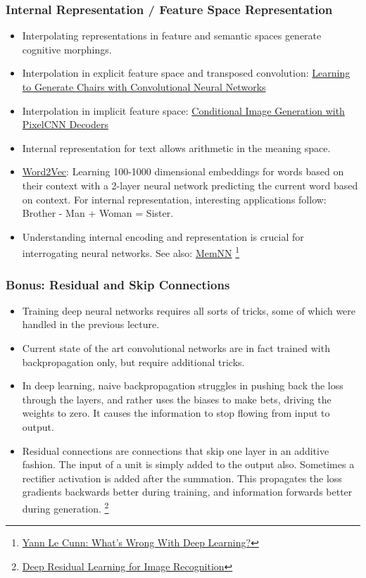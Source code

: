 \documentclass[8pt]{beamer}
\begin{document}
\begin{frame}
\frametitle{Internal Representation / Feature Space Representation}
 \begin{itemize}
  \item Interpolating representations in feature and semantic spaces generate cognitive morphings.
  \item Interpolation in explicit feature space and transposed convolution:
        \href{https://www.youtube.com/watch?v=QCSW4isBDL0}{Learning to Generate Chairs with Convolutional Neural Networks}
  \item Interpolation in implicit feature space:
        \href{https://arxiv.org/abs/1606.05328}{Conditional Image Generation with PixelCNN Decoders}
  \item Internal representation for text allows arithmetic in the meaning space.
  \item \href{http://deeplearning4j.org/word2vec.html}{Word2Vec}: Learning 100-1000 dimensional embeddings for words based on their context with a 2-layer neural network
        predicting the current word based on context. For internal representation, interesting applications follow: Brother - Man + Woman = Sister.
  \item Understanding internal encoding and representation is crucial for interrogating neural networks. See also: \href{http://arxiv.org/pdf/1410.3916v11.pdf}{MemNN}
        \footnote{\href{http://www.pamitc.org/cvpr15/files/lecun-20150610-cvpr-keynote.pdf}{Yann Le Cunn: What's Wrong With Deep Learning?}}
 \end{itemize}
\end{frame}

\begin{frame}
\frametitle{Bonus: Residual and Skip Connections}
 \begin{itemize}
  \item Training deep neural networks requires all sorts of tricks, some of which were handled in the previous lecture.
  \item Current state of the art convolutional networks are in fact trained with backpropagation only, but require additional tricks.
  \item In deep learning, naive backpropagation struggles in pushing back the loss through the layers, and rather uses the biases to make bets, driving the weights to zero.
        It causes the information to stop flowing from input to output.
  \item Residual connections are connections that skip one layer in an additive fashion.
        The input of a unit is simply added to the output also. Sometimes a rectifier activation is added after the summation.
        This propagates the loss gradients backwards better during training, and information forwards better during generation.
        \footnote{\href{https://arxiv.org/abs/1512.03385}{Deep Residual Learning for Image Recognition}}
 \end{itemize}
\end{frame}
\end{document}
